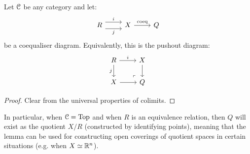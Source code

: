         \begin{lemma} \label{lemma: quotients_as_pushouts}
            Let $\mathcal{C}$ be any category and let:
                $$
                    \begin{tikzcd}
                    R & X & Q
                    \arrow["i", shift left=2, from=1-1, to=1-2]
                    \arrow["j"', shift right=2, from=1-1, to=1-2]
                    \arrow["\coeq", from=1-2, to=1-3]
                    \end{tikzcd}
                $$
            be a coequaliser diagram. Equivalently, this is the pushout diagram:
                $$
                    \begin{tikzcd}
                    R & X \\
                    X & Q
                    \arrow["i", from=1-1, to=1-2]
                    \arrow["j"', from=1-1, to=2-1]
                    \arrow[from=1-2, to=2-2]
                    \arrow[from=2-1, to=2-2]
                    \arrow["\lrcorner"{anchor=center, pos=0.125, rotate=180}, draw=none, from=2-2, to=1-1]
                    \end{tikzcd}
                $$
        \end{lemma}
            \begin{proof}
                Clear from the universal properties of colimits.
            \end{proof}
        \begin{remark}
            In particular, when $\mathcal{C} = \mathrm{Top}$ and when $R$ is an equivalence relation, then $Q$ will exist as the quotient $X/R$ (constructed by identifying points), meaning that the lemma can be used for constructing open coverings of quotient spaces in certain situations (e.g. when $X \simeq \mathbb{R}^n$).
        \end{remark}
        
